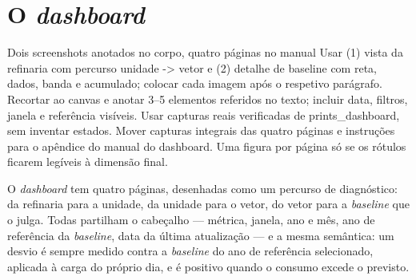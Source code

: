 \section{O \emph{dashboard}}
\label{sec:dashboard}
{Dois screenshots anotados no corpo, quatro páginas no manual}
{Usar (1) vista da refinaria com percurso unidade -\textgreater{} vetor e (2) detalhe
de baseline com reta, dados, banda e acumulado; colocar cada imagem
após o respetivo parágrafo. Recortar ao canvas e anotar 3--5 elementos
referidos no texto; incluir data, filtros, janela e referência visíveis.
Usar capturas reais verificadas de prints\_dashboard, sem inventar estados.
Mover capturas integrais das quatro páginas e instruções para o apêndice do manual do dashboard.
Uma figura por página só se os rótulos ficarem legíveis à dimensão final.}%

O \emph{dashboard} tem quatro páginas, desenhadas como um percurso de
diagnóstico: da refinaria para a unidade, da unidade para o vetor, do
vetor para a \emph{baseline} que o julga. Todas partilham o cabeçalho
--- métrica, janela, ano e mês, ano de referência da \emph{baseline}, data
da última atualização --- e a mesma semântica: um desvio é sempre medido
contra a \emph{baseline} do ano de referência selecionado, aplicada à carga
do próprio dia, e é positivo quando o consumo excede o previsto.

